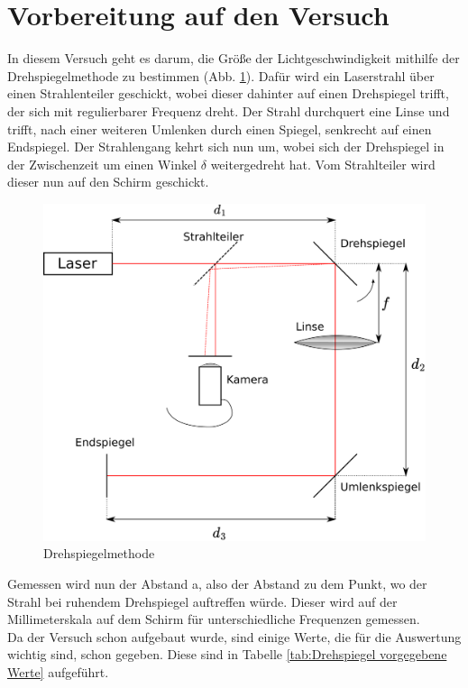 \section{Vorbereitung auf den Versuch}

In diesem Versuch geht es darum, die Größe der Lichtgeschwindigkeit mithilfe der Drehspiegelmethode zu bestimmen (Abb. \ref{fig:Drehspiegelmethode}). Dafür wird ein Laserstrahl über einen Strahlenteiler geschickt, wobei dieser dahinter auf einen Drehspiegel trifft, der sich mit regulierbarer Frequenz dreht. Der Strahl durchquert eine Linse und trifft, nach einer weiteren Umlenken durch einen Spiegel, senkrecht auf einen Endspiegel. Der Strahlengang kehrt sich nun um, wobei sich der Drehspiegel in der Zwischenzeit um einen Winkel $\delta$ weitergedreht hat. Vom Strahlteiler wird dieser nun auf den Schirm geschickt.\\

\begin{figure}
    \centering
    \includegraphics[scale=0.6]{Lichtgeschwindigkeit/Protokoll/fig/Drehspiegelmethode.png}
    \caption{Drehspiegelmethode}
    \label{fig:Drehspiegelmethode}
\end{figure}

Gemessen wird nun der Abstand a, also der Abstand zu dem Punkt, wo der Strahl bei ruhendem Drehspiegel auftreffen würde. Dieser wird auf der Millimeterskala auf dem Schirm für unterschiedliche Frequenzen gemessen.\\
Da der Versuch schon aufgebaut wurde, sind einige Werte, die für die Auswertung wichtig sind, schon gegeben. Diese sind in Tabelle \ref{tab:Drehspiegel vorgegebene Werte} aufgeführt.


